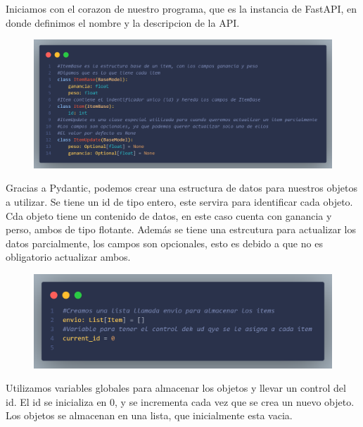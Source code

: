 \documentclass[12pt]{article}
\begin{document}
Iniciamos con el corazon de nuestro programa, que es la instancia de FastAPI, en donde definimos el nombre y la descripcion de la API.\\

\begin{figure}[H]
    \centering
    \includegraphics[width=1\textwidth]{Imagenes/Captura3_esctructuradatos.png}
\end{figure}

Gracias a Pydantic, podemos crear una estructura de datos para nuestros objetos a utilizar.
Se tiene un id de tipo entero, este servira para identificar cada objeto.
Cda objeto tiene un contenido de datos, en este caso cuenta con ganancia y perso, ambos de tipo flotante.
Además se tiene una estrcutura para actualizar los datos parcialmente, los campos son opcionales, esto es debido a que no es obligatorio actualizar ambos.

\begin{figure}[H]
    \centering
    \includegraphics[width=1\textwidth]{Imagenes/Captura4_variablesGlobales.png}
\end{figure}
Utilizamos variables globales para almacenar los objetos y llevar un control del id.
El id se inicializa en 0, y se incrementa cada vez que se crea un nuevo objeto.
Los objetos se almacenan en una lista, que inicialmente esta vacia.
\end{document}
